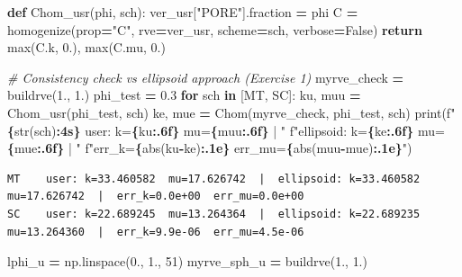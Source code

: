 \documentclass[
  a4paper,
  numbers=noendperiod,
  DIV=12]{scrreprt}
\newenvironment{Shaded}{\begin{snugshade}}{\end{snugshade}}
\newcommand{\BuiltInTok}[1]{#1}
\newcommand{\CommentTok}[1]{\textcolor[rgb]{0.56,0.35,0.01}{\textit{#1}}}
\newcommand{\ControlFlowTok}[1]{\textcolor[rgb]{0.13,0.29,0.53}{\textbf{#1}}}
\newcommand{\DecValTok}[1]{\textcolor[rgb]{0.00,0.00,0.81}{#1}}
\newcommand{\FloatTok}[1]{\textcolor[rgb]{0.00,0.00,0.81}{#1}}
\newcommand{\KeywordTok}[1]{\textcolor[rgb]{0.13,0.29,0.53}{\textbf{#1}}}
\newcommand{\NormalTok}[1]{#1}
\newcommand{\OperatorTok}[1]{\textcolor[rgb]{0.81,0.36,0.00}{\textbf{#1}}}
\newcommand{\SpecialCharTok}[1]{\textcolor[rgb]{0.81,0.36,0.00}{\textbf{#1}}}
\newcommand{\SpecialStringTok}[1]{\textcolor[rgb]{0.31,0.60,0.02}{#1}}
\newcommand{\StringTok}[1]{\textcolor[rgb]{0.31,0.60,0.02}{#1}}
\newcommand{\VariableTok}[1]{\textcolor[rgb]{0.00,0.00,0.00}{#1}}
\begin{document}
\begin{tcolorbox}
\begin{Shaded}
\begin{Highlighting}[]
\KeywordTok{def}\NormalTok{ Chom\_usr(phi, sch):}
\NormalTok{    ver\_usr[}\StringTok{"PORE"}\NormalTok{].fraction }\OperatorTok{=}\NormalTok{ phi}
\NormalTok{    C }\OperatorTok{=}\NormalTok{ homogenize(prop}\OperatorTok{=}\StringTok{"C"}\NormalTok{, rve}\OperatorTok{=}\NormalTok{ver\_usr, scheme}\OperatorTok{=}\NormalTok{sch, verbose}\OperatorTok{=}\VariableTok{False}\NormalTok{)}
    \ControlFlowTok{return} \BuiltInTok{max}\NormalTok{(C.k, }\FloatTok{0.}\NormalTok{), }\BuiltInTok{max}\NormalTok{(C.mu, }\FloatTok{0.}\NormalTok{)}

\CommentTok{\# Consistency check vs ellipsoid approach (Exercise 1)}
\NormalTok{myrve\_check }\OperatorTok{=}\NormalTok{ buildrve(}\FloatTok{1.}\NormalTok{, }\FloatTok{1.}\NormalTok{)}
\NormalTok{phi\_test }\OperatorTok{=} \FloatTok{0.3}
\ControlFlowTok{for}\NormalTok{ sch }\KeywordTok{in}\NormalTok{ [MT, SC]:}
\NormalTok{    ku, muu }\OperatorTok{=}\NormalTok{ Chom\_usr(phi\_test, sch)}
\NormalTok{    ke, mue }\OperatorTok{=}\NormalTok{ Chom(myrve\_check, phi\_test, sch)}
    \BuiltInTok{print}\NormalTok{(}\SpecialStringTok{f"}\SpecialCharTok{\{}\BuiltInTok{str}\NormalTok{(sch)}\SpecialCharTok{:4s\}}\SpecialStringTok{  user: k=}\SpecialCharTok{\{}\NormalTok{ku}\SpecialCharTok{:.6f\}}\SpecialStringTok{  mu=}\SpecialCharTok{\{}\NormalTok{muu}\SpecialCharTok{:.6f\}}\SpecialStringTok{  |  "}
          \SpecialStringTok{f"ellipsoid: k=}\SpecialCharTok{\{}\NormalTok{ke}\SpecialCharTok{:.6f\}}\SpecialStringTok{  mu=}\SpecialCharTok{\{}\NormalTok{mue}\SpecialCharTok{:.6f\}}\SpecialStringTok{  |  "}
          \SpecialStringTok{f"err\_k=}\SpecialCharTok{\{}\BuiltInTok{abs}\NormalTok{(ku}\OperatorTok{{-}}\NormalTok{ke)}\SpecialCharTok{:.1e\}}\SpecialStringTok{  err\_mu=}\SpecialCharTok{\{}\BuiltInTok{abs}\NormalTok{(muu}\OperatorTok{{-}}\NormalTok{mue)}\SpecialCharTok{:.1e\}}\SpecialStringTok{"}\NormalTok{)}
\end{Highlighting}
\end{Shaded}

\begin{verbatim}
MT    user: k=33.460582  mu=17.626742  |  ellipsoid: k=33.460582  mu=17.626742  |  err_k=0.0e+00  err_mu=0.0e+00
SC    user: k=22.689245  mu=13.264364  |  ellipsoid: k=22.689235  mu=13.264360  |  err_k=9.9e-06  err_mu=4.5e-06
\end{verbatim}

\begin{Shaded}
\begin{Highlighting}[]
\NormalTok{lphi\_u }\OperatorTok{=}\NormalTok{ np.linspace(}\FloatTok{0.}\NormalTok{, }\FloatTok{1.}\NormalTok{, }\DecValTok{51}\NormalTok{)}
\NormalTok{myrve\_sph\_u }\OperatorTok{=}\NormalTok{ buildrve(}\FloatTok{1.}\NormalTok{, }\FloatTok{1.}\NormalTok{)}


\end{Highlighting}
\end{Shaded}
\end{tcolorbox}
\end{document}
